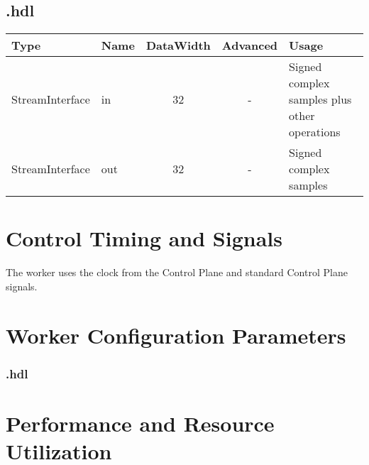 \begin{landscape}
	\subsection*{\comp.hdl}
	\begin{scriptsize}
		\begin{tabular}{|M{2cm}|M{1.5cm}|c|c|M{12cm}|}
			\hline
			Type            & Name & DataWidth & Advanced   & Usage                                    		\\
			\hline
			StreamInterface & in   & 32        & - 			& Signed complex samples plus other operations	\\
			\hline
			StreamInterface & out  & 32        & - 			& Signed complex samples 						\\
			\hline
		\end{tabular}
	\end{scriptsize}
\end{landscape}

\section*{Control Timing and Signals}
\begin{flushleft}
	The \comp worker{} uses the clock from the Control Plane and standard Control Plane signals.\\
\end{flushleft}

\begin{landscape}
\section*{Worker Configuration Parameters}
\subsubsection*{\comp.hdl}

\section*{Performance and Resource Utilization}

\end{landscape}

